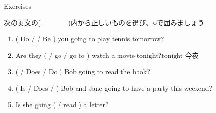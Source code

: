 \documentclass[aspectratio=169,xcolor={dvipsnames,table}]{beamer}
\newcommand{\myaudio}[1]{\href{#1}{\faVolumeUp}}
\begin{document}
\begin{frame}[plain]{Exercises}

次の英文の(~~~~~~~~)内から正しいものを選び、○で囲みましょう

\begin{enumerate}
 \item ( Do /  / Be )  you going to play tennis tomorrow?
 \item Are they (  / go  / go to ) watch a movie tonight?\hfill{\scriptsize tonight  今夜}
 \item  (  / Does / Do ) Bob going to read the book?
 \item ( Is / Does /   ) Bob and Jane going to have a party this weekend?
 \item  Is she going (  / read ) a letter?
\end{enumerate}
\hfill\myaudio{./audio/011_be_going_to_07.mp3}

 \end{frame}
\end{document}
